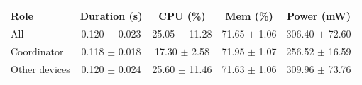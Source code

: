 \begin{tabular}{lcccc}
\hline
\textbf{Role} & \textbf{Duration (s)} & \textbf{CPU (\%)} & \textbf{Mem (\%)} & \textbf{Power (mW)} \\
\hline
All & 0.120 $\pm$ 0.023 & 25.05 $\pm$ 11.28 & 71.65 $\pm$ 1.06 & 306.40 $\pm$ 72.60 \\
Coordinator & 0.118 $\pm$ 0.018 & 17.30 $\pm$ 2.58 & 71.95 $\pm$ 1.07 & 256.52 $\pm$ 16.59 \\
Other devices & 0.120 $\pm$ 0.024 & 25.60 $\pm$ 11.46 & 71.63 $\pm$ 1.06 & 309.96 $\pm$ 73.76 \\
\hline
\end{tabular}

